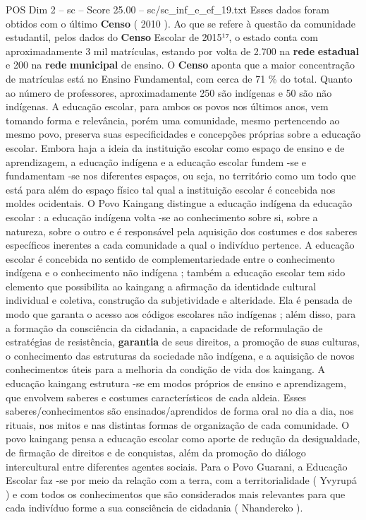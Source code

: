 \begin{textsample}{POS Dim 2 – sc – Score 25.00 – sc/sc\_inf\_e\_ef\_19.txt}
Esses dados foram obtidos com o último \textbf{Censo} ( 2010 ).
Ao que se refere à questão da comunidade estudantil, pelos dados do \textbf{Censo} Escolar de 2015¹⁷, o estado conta com aproximadamente 3 mil matrículas, estando por volta de 2.700 na \textbf{rede} \textbf{estadual} e 200 na \textbf{rede} \textbf{municipal} de ensino.
O \textbf{Censo} aponta que a maior concentração de matrículas está no Ensino Fundamental, com cerca de 71 \% do total.
Quanto ao número de professores, aproximadamente 250 são indígenas e 50 são não indígenas.
A educação escolar, para ambos os povos nos últimos anos, vem tomando forma e relevância, porém uma comunidade, mesmo pertencendo ao mesmo povo, preserva suas especificidades e concepções próprias sobre a educação escolar.
Embora haja a ideia da instituição escolar como espaço de ensino e de aprendizagem, a educação indígena e a educação escolar fundem -se e fundamentam -se nos diferentes espaços, ou seja, no território como um todo que está para além do espaço físico tal qual a instituição escolar é concebida nos moldes ocidentais.
O Povo Kaingang distingue a educação indígena da educação escolar : a educação indígena volta -se ao conhecimento sobre si, sobre a natureza, sobre o outro e é responsável pela aquisição dos costumes e dos saberes específicos inerentes a cada comunidade a qual o indivíduo pertence.
A educação escolar é concebida no sentido de complementariedade entre o conhecimento indígena e o conhecimento não indígena ; também a educação escolar tem sido elemento que possibilita ao kaingang a afirmação da identidade cultural individual e coletiva, construção da subjetividade e alteridade.
Ela é pensada de modo que garanta o acesso aos códigos escolares não indígenas ; além disso, para a formação da consciência da cidadania, a capacidade de reformulação de estratégias de resistência, \textbf{garantia} de seus direitos, a promoção de suas culturas, o conhecimento das estruturas da sociedade não indígena, e a aquisição de novos conhecimentos úteis para a melhoria da condição de vida dos kaingang.
A educação kaingang estrutura -se em modos próprios de ensino e aprendizagem, que envolvem saberes e costumes característicos de cada aldeia.
Esses saberes/conhecimentos são ensinados/aprendidos de forma oral no dia a dia, nos rituais, nos mitos e nas distintas formas de organização de cada comunidade.
O povo kaingang pensa a educação escolar como aporte de redução da desigualdade, de firmação de direitos e de conquistas, além da promoção do diálogo intercultural entre diferentes agentes sociais.
Para o Povo Guarani, a Educação Escolar faz -se por meio da relação com a terra, com a territorialidade ( Yvyrupá ) e com todos os conhecimentos que são considerados mais relevantes para que cada indivíduo forme a sua consciência de cidadania ( Nhandereko ).

\end{textsample}
